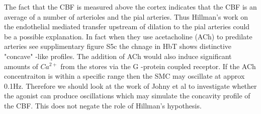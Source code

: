 \documentclass{article}
\newcommand{\commJoey}[1]{{\color{red}{\em Joey: #1}}}
\begin{document}
{The fact that the CBF is measured above the cortex indicates that the CBF is an average of a number of arterioles and the pial arteries. Thus Hillman's work \cite{Chen2014a} on the endothelial mediated transfer upstream of dilation to the pial arteries could be a possible explanation. In fact when they use acetacholine (ACh) to predilate arteries see supplimentary figure S5c the chnage in HbT shows distinctive "concave" -like profiles. The addition of ACh would also induce significant amounts of $Ca^{2+}$ from the stores via the G -protein coupled receptor. If the ACh concentraiton is within a specific range then the SMC may oscillate at approx 0.1Hz. Therefore we should look at the work of Johny et al \cite{Johny2017} to investigate whether the agonist can produce oscillations which may simulate the concavity profile of the CBF. This does not negate the role of Hillman's hypothesis.
}



\end{document}
